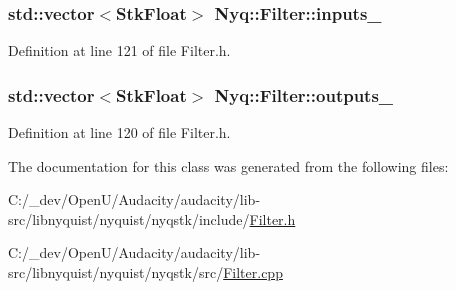 \subsubsection[{\texorpdfstring{inputs\+\_\+}{inputs_}}]{\setlength{\rightskip}{0pt plus 5cm}std\+::vector$<${\bf Stk\+Float}$>$ Nyq\+::\+Filter\+::inputs\+\_\+\hspace{0.3cm}{\ttfamily [protected]}}\hypertarget{class_nyq_1_1_filter_ab0bdd1670dfdae6f3311f8f44049ca09}{}\label{class_nyq_1_1_filter_ab0bdd1670dfdae6f3311f8f44049ca09}


Definition at line 121 of file Filter.\+h.

\subsubsection[{\texorpdfstring{outputs\+\_\+}{outputs_}}]{\setlength{\rightskip}{0pt plus 5cm}std\+::vector$<${\bf Stk\+Float}$>$ Nyq\+::\+Filter\+::outputs\+\_\+\hspace{0.3cm}{\ttfamily [protected]}}\hypertarget{class_nyq_1_1_filter_a82766e0a2ec5589c5dfb828a34091d7d}{}\label{class_nyq_1_1_filter_a82766e0a2ec5589c5dfb828a34091d7d}


Definition at line 120 of file Filter.\+h.



The documentation for this class was generated from the following files\+:\begin{DoxyCompactItemize}
\item 
C\+:/\+\_\+dev/\+Open\+U/\+Audacity/audacity/lib-\/src/libnyquist/nyquist/nyqstk/include/\hyperlink{libnyquist_2nyquist_2nyqstk_2include_2_filter_8h}{Filter.\+h}\item 
C\+:/\+\_\+dev/\+Open\+U/\+Audacity/audacity/lib-\/src/libnyquist/nyquist/nyqstk/src/\hyperlink{_filter_8cpp}{Filter.\+cpp}\end{DoxyCompactItemize}
